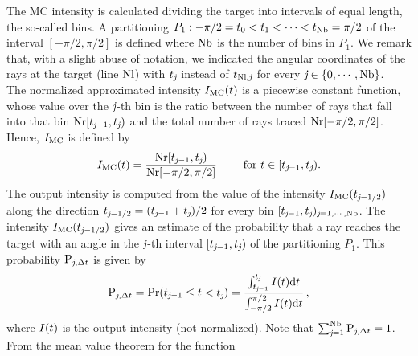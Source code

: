 The MC intensity is calculated dividing the target into intervals of equal length, the so-called bins. A partitioning
$P_1: -\pi/2 = t_{0}<t_{1}<\cdots <t_{\textrm{Nb}}=\pi/2$ of the interval $[-\pi/2, \pi/2]$ is defined where $\textrm{Nb}$ is the number of bins in $P_1$.
We remark that, with a slight abuse of notation, we indicated the angular coordinates of the rays at the target (line $\textrm{Nl}$) with $t_{\textit{j}}$ instead of $t_{\textrm{Nl},\textit{j}}$ for every $\textit{j}\in\{0, \cdots, \textrm{Nb}\}$. \\ \indent
The normalized approximated intensity $I_{\textrm{MC}}(t)$ is a piecewise constant function, whose value over the $\textit{j}$-th bin is the ratio between the number of rays that fall into that bin
$\textrm{Nr}[t_{\textit{j}-1},t_{\textit{j}})$ and the total number of rays traced $\textrm{Nr}[-\pi/2, \pi/2]$.
Hence, $I_{\textrm{MC}}$ is defined by
\begin{equation} \label{g_mc}
I_{\textrm{MC}}(t) = \frac{\textrm{Nr}[t_{\textit{j}-1},t_{\textit{j}})}{\textrm{Nr}[-\pi/2, \pi/2]} \qquad \mbox{ for } t\in[t_{\textit{j}-1}, t_{\textit{j}}).
\end{equation}
The output intensity is computed from the value of the intensity $I_{\textrm{MC}}(t_{\textit{j}-1/2})$ along the direction $t_{\textit{j}-1/2}=(t_{\textit{j}-1}+
t_{\textit{j}})/2$ for every bin $[t_{\textit{j}-1},t_{\textit{j}})_{\textit{j} = 1, \cdots, \textrm{Nb}}$.
 The intensity $I_{\textrm{MC}}(t_{\textit{j}-1/2})$ gives an estimate of the probability that a ray reaches the target with an angle in the $\textit{j}$-th interval
$[t_{\textit{j}-1}, t_{\textit{j}})$ of the partitioning $P_1$. This probability $\textrm{P}_{\textit{j}, \Delta t}$ is given by
\begin{equation}\label{eq:probability}
\textrm{P}_{\textit{j}, \Delta t} = \Pr(t_{\textit{j}-1}\leq t<t_{\textit{j}})=
\frac{\int_{t_{\textit{j}-1}}^{t_{\textit{j}}} I(t) \textrm{d}t}{\int_{-\pi/2}^{\pi/2}I(t) \textrm{d}t}\,,
\end{equation}
where $I(t)$ is the output intensity (not normalized).
Note that $\sum_{\textit{j}=1}^{\textrm{Nb}}\textrm{P}_{\textit{j}, \Delta t}=1$. From the mean value theorem for the function
